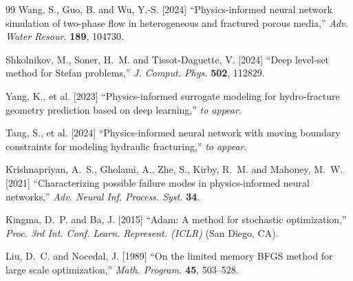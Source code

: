 \documentclass{ws-ijcm}
\begin{document}
\begin{thebibliography}{99}
Wang, S., Guo, B. and Wu, Y.-S. [2024] ``Physics-informed neural network
  simulation of two-phase flow in heterogeneous and fractured porous media,''
  \emph{Adv. Water Resour.} \textbf{189}, 104730.

Shkolnikov, M., Soner, H.~M. and Tissot-Daguette, V. [2024] ``Deep level-set
  method for Stefan problems,''
  \emph{J. Comput. Phys.} \textbf{502}, 112829.

Yang, K., et al. [2023]
  ``Physics-informed surrogate modeling for hydro-fracture geometry prediction
  based on deep learning,''
  \emph{to appear}.

Tang, S., et al. [2024]
  ``Physics-informed neural network with moving boundary constraints for
  modeling hydraulic fracturing,''
  \emph{to appear}.

Krishnapriyan, A.~S., Gholami, A., Zhe, S., Kirby, R.~M. and Mahoney, M.~W.
  [2021] ``Characterizing possible failure modes in physics-informed neural
  networks,''
  \emph{Adv. Neural Inf. Process. Syst.} \textbf{34}.

Kingma, D.~P. and Ba, J. [2015] ``Adam: A method for stochastic optimization,''
  \emph{Proc. 3rd Int. Conf. Learn. Represent. (ICLR)} (San Diego, CA).

Liu, D.~C. and Nocedal, J. [1989] ``On the limited memory BFGS method for large
  scale optimization,''
  \emph{Math. Program.} \textbf{45}, 503--528.

\end{thebibliography}
\end{document}
